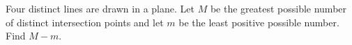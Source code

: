 Four distinct lines are drawn in a plane. Let $M$ be the greatest possible number of distinct intersection points and let $m$ be the least positive possible number. Find $M-m$.
